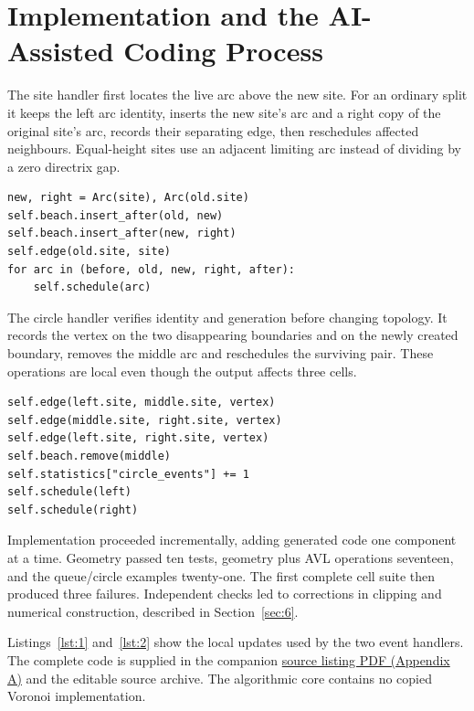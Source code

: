 \section{Implementation and the AI-Assisted Coding Process}
\label{sec:4}

The site handler first locates the live arc above the new site. For an ordinary split it keeps the left arc identity, inserts the new site's arc and a right copy of the original site's arc, records their separating edge, then reschedules affected neighbours. Equal-height sites use an adjacent limiting arc instead of dividing by a zero directrix gap.

\begin{lstlisting}[caption={Local arc insertion during a site event.},label={lst:1}]
new, right = Arc(site), Arc(old.site)
self.beach.insert_after(old, new)
self.beach.insert_after(new, right)
self.edge(old.site, site)
for arc in (before, old, new, right, after):
    self.schedule(arc)
\end{lstlisting}

The circle handler verifies identity and generation before changing topology. It records the vertex on the two disappearing boundaries and on the newly created boundary, removes the middle arc and reschedules the surviving pair. These operations are local even though the output affects three cells.

\begin{lstlisting}[caption={Boundary updates during a valid circle event.},label={lst:2}]
self.edge(left.site, middle.site, vertex)
self.edge(middle.site, right.site, vertex)
self.edge(left.site, right.site, vertex)
self.beach.remove(middle)
self.statistics["circle_events"] += 1
self.schedule(left)
self.schedule(right)
\end{lstlisting}

Implementation proceeded incrementally, adding generated code one component at a time. Geometry passed ten tests, geometry plus AVL operations seventeen, and the queue/circle examples twenty-one. The first complete cell suite then produced three failures. Independent checks led to corrections in clipping and numerical construction, described in Section~\ref{sec:6}.

Listings~\ref{lst:1} and~\ref{lst:2} show the local updates used by the two event handlers. The complete code is supplied in the companion \href{source_appendix.pdf}{source listing PDF (Appendix A)} and the editable source archive. The algorithmic core contains no copied Voronoi implementation.

